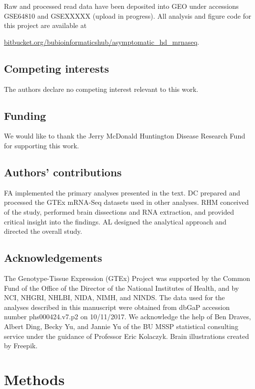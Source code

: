 \documentclass[fleqn,10pt,table]{wlscirep}
\begin{document}
Raw and processed read data have been deposited into GEO under accessions GSE64810 and GSEXXXXX (upload in progress).
All analysis and figure code for this project are available at

\href{https://bitbucket.org/bubioinformaticshub/asymptomatic_hd_mrnaseq}{bitbucket.org/bubioinformaticshub/asymptomatic\_hd\_mrnaseq}.

\subsection{Competing interests}

The authors declare no competing interest relevant to this work.

\subsection{Funding}

We would like to thank the Jerry McDonald Huntington Disease Research Fund for supporting this work.

\subsection{Authors' contributions}

FA implemented the primary analyses presented in the text.
DC prepared and processed the GTEx mRNA-Seq datasets used in other analyses.
RHM conceived of the study, performed brain dissections and RNA extraction, and provided critical insight into the findings.
AL designed the analytical approach and directed the overall study.

\subsection{Acknowledgements}

The Genotype-Tissue Expression (GTEx) Project was supported by the Common Fund of the Office of the Director of the National Institutes of Health, and by NCI, NHGRI, NHLBI, NIDA, NIMH, and NINDS.
The data used for the analyses described in this manuscript were obtained from dbGaP accession number phs000424.v7.p2 on 10/11/2017.
We acknowledge the help of Ben Draves, Albert Ding, Becky Yu, and Jannie Yu of the BU MSSP statistical consulting service under the guidance of Professor Eric Kolaczyk. 
Brain illustrations created by Freepik.


\section{Methods}
\end{document}
